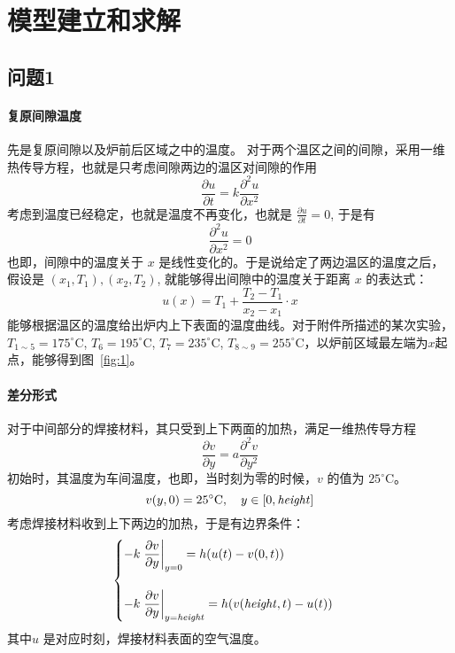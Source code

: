 \documentclass[../main.tex]{subfiles}
\begin{document}
\section{模型建立和求解}

\subsection{问题1}
\paragraph{复原间隙温度} 先是复原间隙以及炉前后区域之中的温度。
对于两个温区之间的间隙，采用一维热传导方程，也就是只考虑间隙两边的温区对间隙的作用
\begin{equation}
\frac{\partial u}{\partial t} = k \frac{\partial ^{2} u}{ \partial x ^{2}}
\end{equation}
考虑到温度已经稳定，也就是温度不再变化，也就是 \(\frac{\partial u}{ \partial t} = 0\), 于是有
\begin{equation}
\frac{\partial ^{2} u}{\partial x ^{2}} = 0
\end{equation}
也即，间隙中的温度关于 \(x\) 是线性变化的。于是说给定了两边温区的温度之后，假设是 \((x_1, T_1), (x_2, T_2)\), 就能够得出间隙中的温度关于距离 \(x\) 的表达式：
\[
u(x)  = T_{1} + \frac{T_2 - T_1}{x_2 - x_1} \cdot x
\]
能够根据温区的温度给出炉内上下表面的温度曲线。对于附件所描述的某次实验，\(T _{1 \sim 5} = 17 5 ^{\circ}\mathrm{C}\), \(T _{6} = 195 ^{\circ}\mathrm{C}\), \(T _{7} = 235 ^{\circ}\mathrm{C}\), \(T _{8 \sim 9} = 255 ^{\circ}\mathrm{C}\)，以炉前区域最左端为\(x\)起点，能够得到图~\ref{fig:1}。


\paragraph{差分形式} 对于中间部分的焊接材料，其只受到上下两面的加热，满足一维热传导方程
\begin{equation}
\frac{\partial v}{\partial y} = a \frac{\partial ^{2} v}{ \partial y ^{2}} \label{equ:one-dim}
\end{equation}
初始时，其温度为车间温度，也即，当时刻为零的时候，\(v\) 的值为 \(25 ^{\circ}\mathrm{C}\)。
\begin{equation}
v (y, 0) = 25 ^{\circ}\mathrm{C}, \quad y \in [0, {\it height}]
\end{equation}
考虑焊接材料收到上下两边的加热，于是有边界条件：
\begin{equation}
\begin{cases}
\displaystyle- k \left.\frac{\partial v}{\partial y}\right|_{y = 0} =  h (u(t) - v(0, t)) \\
\\
\displaystyle- k \left.\frac{\partial v}{\partial y}\right|_{y = {\it height}} = h (v({\it height}, t) - u(t))
\end{cases}
\end{equation}
其中\(u\) 是对应时刻，焊接材料表面的空气温度。
\end{document}
